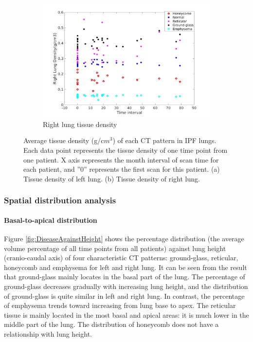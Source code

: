 \begin{figure}[H]
\begin{subfigure}{.7\linewidth}
  \includegraphics[width=\linewidth,trim={{.0\wd0} {.0\wd0} {.0\wd0} {.0\wd0}},clip]{QuantitativeAnalysis/Image/RightLungDensity.jpg}
  \caption{Right lung tissue density}
  \label{fig:LungDensity-b} 
\end{subfigure}
\caption{Average tissue density (g/c$m^3$) of each CT pattern in IPF lungs. Each data point represents the tissue density of one time point from one patient. X axis represents the month interval of scan time for each patient, and ''0'' represents the first scan for this patient. (a) Tissue density of left lung. (b) Tissue density of right lung.}
\label{fig:LungDensity}
\end{figure}

\subsubsection{Spatial distribution analysis}
\paragraph{Basal-to-apical distribution}
Figure \ref{fig:DiseaseAgainstHeight} shows the percentage distribution (the average volume percentage of all time points from all patients) against lung height (cranio-caudal axis) of four characteristic CT patterns: ground-glass, reticular, honeycomb and emphysema for left and right lung. It can be seen from the result that ground-glass mainly locates in the basal part of the lung. The percentage of ground-glass decreases gradually with increasing lung height, and the distribution of ground-glass is quite similar in left and right lung. In contrast, the percentage of emphysema trends toward increasing from lung base to apex. The reticular tissue is mainly located in the most basal and apical areas: it is much lower in the middle part of the lung. The distribution of honeycomb does not have a relationship with lung height.

